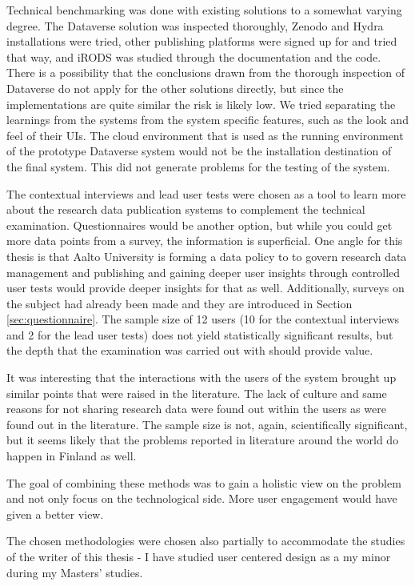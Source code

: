 Technical benchmarking was done with existing solutions to a somewhat varying degree.
The Dataverse solution was inspected thoroughly, Zenodo and Hydra installations were tried,
other publishing platforms were signed up for and tried that way, and iRODS
was studied through the documentation and the code. There is a possibility
that the conclusions drawn from the thorough inspection of Dataverse do not
apply for the other solutions directly, but since the implementations are quite
similar the risk is likely low. We tried separating the learnings from the
systems from the system specific features, such as the look and feel of their
UIs. The cloud environment that is used as the running environment of the prototype
Dataverse system would not be the installation destination of the final system.
This did not generate problems for the testing of the system.

The contextual interviews and lead user tests were chosen as a tool to learn
more about the research data publication systems to complement the technical
examination. Questionnaires would be another option, but while you could get more data
points from a survey, the information is superficial. One angle for this thesis
is that Aalto University is forming a data policy to to govern research data
management and publishing and gaining deeper user insights through controlled
user tests would provide deeper insights for that as well. Additionally,
surveys on the subject had already been made and they are introduced in
Section \ref{sec:questionnaire}. The sample size
of 12 users (10 for the contextual interviews and 2 for the lead user tests)
does not yield statistically significant results, but the depth that the
examination was carried out with should provide value.

It was interesting that the interactions with the users of the system brought
up similar points that were raised in the literature. The lack of culture and
same reasons for not sharing research data were found out within the users as were
found out in the literature.
The sample size is not, again, scientifically significant, but
it seems likely that the problems reported in literature around the world do
happen in Finland as well.

The goal of combining these methods was to gain a holistic view on the problem
and not only focus on the technological side. More user engagement would have
given a better view.

The chosen methodologies were chosen also partially to accommodate the studies
of the writer of this thesis - I have studied user centered design as a my
minor during my Masters' studies.

